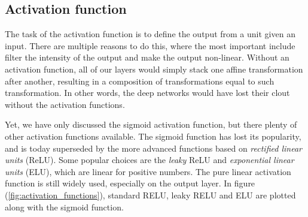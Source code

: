 \subsection{Activation function}
The task of the activation function is to define the output from a unit given an input. There are multiple reasons to do this, where the most important include filter the intensity of the output and make the output non-linear. Without an activation function, all of our layers would simply stack one affine transformation after another, resulting in a composition of transformations equal to such transformation. In other words, the deep networks would have lost their clout without the activation functions. 

Yet, we have only discussed the sigmoid activation function, but there plenty of other activation functions available. The sigmoid function has lost its popularity, and is today superseded by the more advanced functions based on \textit{rectified linear units} (ReLU). Some popular choices are the \textit{leaky} ReLU and \textit{exponential linear units} (ELU), which are linear for positive numbers. The pure linear activation function is still widely used, especially on the output layer. In figure (\ref{fig:activation_functions}), standard RELU, leaky RELU and ELU are plotted along with the sigmoid function.

